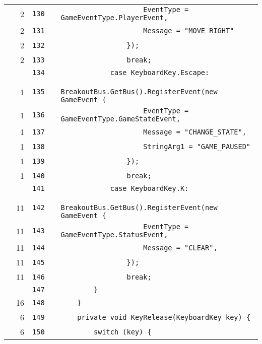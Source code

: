 \documentclass[a4paper,landscape,10pt]{article}
\begin{document}
\begin{longtable}[l]{lrrll}
\cellcolor{green} & 2 & \verb~130~ & & \verb~                    EventType = GameEventType.PlayerEvent,~\\
\cellcolor{green} & 2 & \verb~131~ & & \verb~                    Message = "MOVE RIGHT"~\\
\cellcolor{green} & 2 & \verb~132~ & & \verb~                });~\\
\cellcolor{green} & 2 & \verb~133~ & & \verb~                break;~\\
\cellcolor{gray} &  & \verb~134~ & & \verb~            case KeyboardKey.Escape:~\\
\cellcolor{green} & 1 & \verb~135~ & & \verb~                BreakoutBus.GetBus().RegisterEvent(new GameEvent {~\\
\cellcolor{green} & 1 & \verb~136~ & & \verb~                    EventType = GameEventType.GameStateEvent,~\\
\cellcolor{green} & 1 & \verb~137~ & & \verb~                    Message = "CHANGE_STATE",~\\
\cellcolor{green} & 1 & \verb~138~ & & \verb~                    StringArg1 = "GAME_PAUSED"~\\
\cellcolor{green} & 1 & \verb~139~ & & \verb~                });~\\
\cellcolor{green} & 1 & \verb~140~ & & \verb~                break;~\\
\cellcolor{gray} &  & \verb~141~ & & \verb~            case KeyboardKey.K:~\\
\cellcolor{green} & 11 & \verb~142~ & & \verb~                BreakoutBus.GetBus().RegisterEvent(new GameEvent {~\\
\cellcolor{green} & 11 & \verb~143~ & & \verb~                    EventType = GameEventType.StatusEvent,~\\
\cellcolor{green} & 11 & \verb~144~ & & \verb~                    Message = "CLEAR",~\\
\cellcolor{green} & 11 & \verb~145~ & & \verb~                });~\\
\cellcolor{green} & 11 & \verb~146~ & & \verb~                break;~\\
\cellcolor{gray} &  & \verb~147~ & & \verb~        }~\\
\cellcolor{green} & 16 & \verb~148~ & & \verb~    }~\\
\cellcolor{green} & 6 & \verb~149~ & & \verb~    private void KeyRelease(KeyboardKey key) {~\\
\cellcolor{green} & 6 & \verb~150~ & & \verb~        switch (key) {~\\

\end{longtable}
\end{document}
